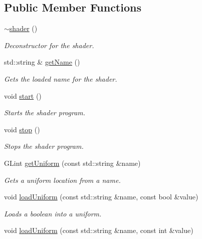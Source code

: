 \subsection*{Public Member Functions}
\begin{DoxyCompactItemize}
\item 
\hyperlink{classflounder_1_1shader_abd3f0fc712e7e178f18bf275c85e3337}{$\sim$shader} ()
\begin{DoxyCompactList}\small\item\em Deconstructor for the shader. \end{DoxyCompactList}\item 
std\+::string \& \hyperlink{classflounder_1_1shader_a5971b780ec6535aeb0ca70fefd41daa9}{get\+Name} ()
\begin{DoxyCompactList}\small\item\em Gets the loaded name for the shader. \end{DoxyCompactList}\item 
void \hyperlink{classflounder_1_1shader_a4b1f6770ce28db4f9a4b20e0842d785e}{start} ()
\begin{DoxyCompactList}\small\item\em Starts the shader program. \end{DoxyCompactList}\item 
void \hyperlink{classflounder_1_1shader_a2972bda7e96b86de9a12a44e3e285691}{stop} ()
\begin{DoxyCompactList}\small\item\em Stops the shader program. \end{DoxyCompactList}\item 
G\+Lint \hyperlink{classflounder_1_1shader_ab4d3af8b3ffe94ff901b15376215c2e2}{get\+Uniform} (const std\+::string \&name)
\begin{DoxyCompactList}\small\item\em Gets a uniform location from a name. \end{DoxyCompactList}\item 
void \hyperlink{classflounder_1_1shader_a1767f4ca2d3b1eb35dc4435e2aa3fd67}{load\+Uniform} (const std\+::string \&name, const bool \&value)
\begin{DoxyCompactList}\small\item\em Loads a boolean into a uniform. \end{DoxyCompactList}\item 
void \hyperlink{classflounder_1_1shader_a597fdaefa4644b107e8ce2776ce69f76}{load\+Uniform} (const std\+::string \&name, const int \&value)

\end{DoxyCompactItemize}
